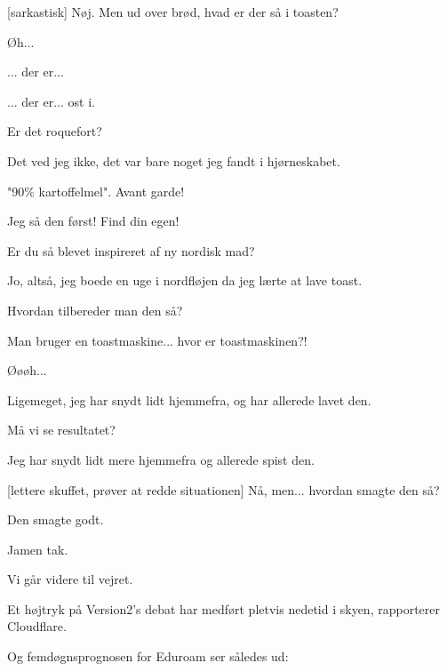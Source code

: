 \documentclass[a4paper,11pt]{article}
\begin{document}
\begin{sketch}
[sarkastisk] Nøj.   Men ud over brød, hvad er der så i toasten?

 Øh...


 ... der er...


 ... der er... ost i.


 Er det roquefort?

 Det ved jeg ikke, det var bare noget jeg fandt i hjørneskabet.


 "90\% kartoffelmel". Avant garde!


 Jeg så den først! Find din egen!

 Er du så blevet inspireret af ny nordisk mad?

 Jo, altså, jeg boede en uge i nordfløjen da jeg lærte at lave toast.

 Hvordan tilbereder man den så?

 Man bruger en toastmaskine... hvor er toastmaskinen?!

 Øøøh...

 Ligemeget, jeg har snydt lidt hjemmefra, og har allerede lavet den.

 Må vi se resultatet?


 Jeg har snydt lidt mere hjemmefra og allerede spist den.

[lettere skuffet, prøver at redde situationen] Nå,
men... hvordan smagte den så?

 Den smagte godt.

 Jamen tak.


 Vi går videre til vejret.


 Et højtryk på Version2's debat har medført pletvis nedetid i skyen,
rapporterer Cloudflare.

 Og femdøgnsprognosen for Eduroam ser således ud:


\end{sketch}
\end{document}
